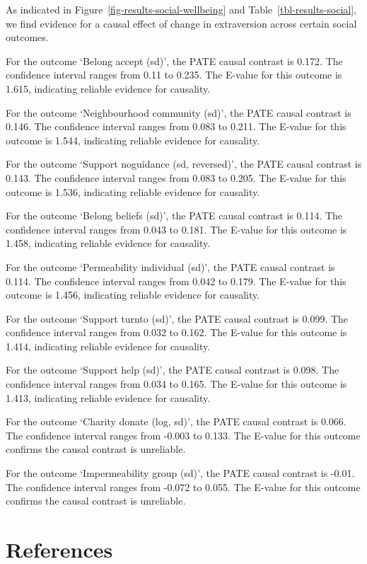 \documentclass[
  singlecolumn]{report}
\begin{document}
As indicated in Figure~\ref{fig-results-social-wellbeing} and
Table~\ref{tbl-results-social}, we find evidence for a causal effect of
change in extraversion across certain social outcomes.

For the outcome `Belong accept (sd)', the PATE causal contrast is 0.172.
The confidence interval ranges from 0.11 to 0.235. The E-value for this
outcome is 1.615, indicating reliable evidence for causality.

For the outcome `Neighbourhood community (sd)', the PATE causal contrast
is 0.146. The confidence interval ranges from 0.083 to 0.211. The
E-value for this outcome is 1.544, indicating reliable evidence for
causality.

For the outcome `Support noguidance (sd, reversed)', the PATE causal
contrast is 0.143. The confidence interval ranges from 0.083 to 0.205.
The E-value for this outcome is 1.536, indicating reliable evidence for
causality.

For the outcome `Belong beliefs (sd)', the PATE causal contrast is
0.114. The confidence interval ranges from 0.043 to 0.181. The E-value
for this outcome is 1.458, indicating reliable evidence for causality.

For the outcome `Permeability individual (sd)', the PATE causal contrast
is 0.114. The confidence interval ranges from 0.042 to 0.179. The
E-value for this outcome is 1.456, indicating reliable evidence for
causality.

For the outcome `Support turnto (sd)', the PATE causal contrast is
0.099. The confidence interval ranges from 0.032 to 0.162. The E-value
for this outcome is 1.414, indicating reliable evidence for causality.

For the outcome `Support help (sd)', the PATE causal contrast is 0.098.
The confidence interval ranges from 0.034 to 0.165. The E-value for this
outcome is 1.413, indicating reliable evidence for causality.

For the outcome `Charity donate (log, sd)', the PATE causal contrast is
0.066. The confidence interval ranges from -0.003 to 0.133. The E-value
for this outcome confirms the causal contrast is unreliable.

For the outcome `Impermeability group (sd)', the PATE causal contrast is
-0.01. The confidence interval ranges from -0.072 to 0.055. The E-value
for this outcome confirms the causal contrast is unreliable.

\newpage{}

\hypertarget{references}{%
\section*{References}\label{references}}
\end{document}
